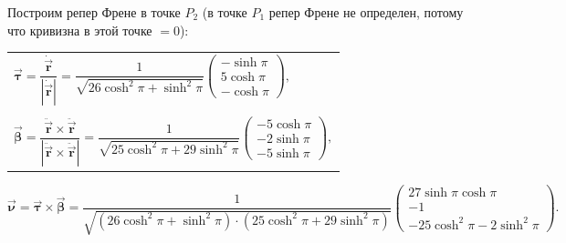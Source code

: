 \documentclass[12pt,a4paper]{article}
\newcommand{\boldVec}[1]{\vec{\mathbf #1}}
\newcommand{\vectorProduct}[2]{\boldVec #1 \times \boldVec #2}
\begin{document}
    Построим репер Френе в точке $ P_2 $ (в точке $ P_1$ репер Френе не определен, потому что кривизна в этой точке $ = 0$):
    \begin{table}[h!]
        \centering
        \begin{tabular}{l}
            $
                \boldVec{\tau} = \dfrac{\dot{\boldVec{r}}}{|\dot{\boldVec{r}}|} = \dfrac{1}{\sqrt{26 \cosh^2 \pi + \sinh^2 \pi}} 
                    \begin{pmatrix}
                        -\sinh \pi 
                        \\
                        5 \cosh \pi
                        \\
                        -\cosh \pi
                    \end{pmatrix}\!,
            $
            \\ \\ 
            $
                \boldVec{\beta} = \dfrac{\ddot{\boldVec r} \times \ddot{\boldVec r}}{ | \ddot{\boldVec r} \times \ddot{\boldVec r} |} = \dfrac{1}{\sqrt{25\cosh^2 \pi + 29\sinh^2 \pi}} 
                    \begin{pmatrix}
                        -5\cosh \pi 
                        \\
                        -2\sinh \pi
                        \\
                        -5\sinh \pi 
                    \end{pmatrix}\!,
            $
        \end{tabular}
    \end{table}
    \[
        \boldVec{\nu} = \vectorProduct{\tau}{\beta} = \dfrac{1}{\sqrt{(26 \cosh^2 \pi + \sinh^2 \pi) \cdot (25\cosh^2 \pi + 29\sinh^2 \pi)}}
            \begin{pmatrix}
                27 \sinh \pi \cosh \pi
                \\
                -1
                \\
                -25 \cosh^2 \pi - 2\sinh^2 \pi
            \end{pmatrix}\!.
    \]
\end{document}
